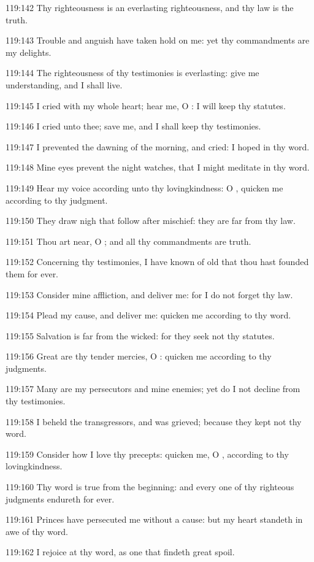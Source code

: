119:142 Thy righteousness is an everlasting righteousness, and thy law is the truth.

119:143 Trouble and anguish have taken hold on me: yet thy commandments are my delights.

119:144 The righteousness of thy testimonies is everlasting: give me understanding, and I shall live.

119:145 I cried with my whole heart; hear me, O \LORD: I will keep thy statutes.

119:146 I cried unto thee; save me, and I shall keep thy testimonies.

119:147 I prevented the dawning of the morning, and cried: I hoped in thy word.

119:148 Mine eyes prevent the night watches, that I might meditate in thy word.

119:149 Hear my voice according unto thy lovingkindness: O \LORD, quicken me according to thy judgment.

119:150 They draw nigh that follow after mischief: they are far from thy law.

119:151 Thou art near, O \LORD; and all thy commandments are truth.

119:152 Concerning thy testimonies, I have known of old that thou hast founded them for ever.

119:153 Consider mine affliction, and deliver me: for I do not forget thy law.

119:154 Plead my cause, and deliver me: quicken me according to thy word.

119:155 Salvation is far from the wicked: for they seek not thy statutes.

119:156 Great are thy tender mercies, O \LORD: quicken me according to thy judgments.

119:157 Many are my persecutors and mine enemies; yet do I not decline from thy testimonies.

119:158 I beheld the transgressors, and was grieved; because they kept not thy word.

119:159 Consider how I love thy precepts: quicken me, O \LORD, according to thy lovingkindness.

119:160 Thy word is true from the beginning: and every one of thy righteous judgments endureth for ever.

119:161 Princes have persecuted me without a cause: but my heart standeth in awe of thy word.

119:162 I rejoice at thy word, as one that findeth great spoil.

